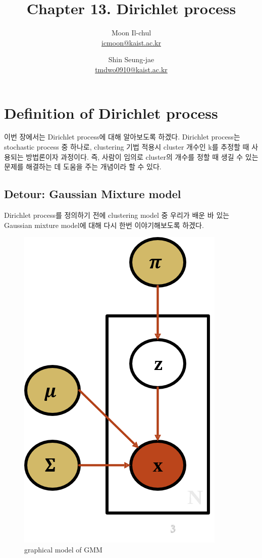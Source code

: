 \documentclass[a4paper]{oblivoir}
\author{Moon Il-chul \\ \href{mailto:icmoon@kaist.ac.kr}{icmoon@kaist.ac.kr} 
   \and Shin Seung-jae \\ \href{mailto:tmdwo0910@kaist.ac.kr}{tmdwo0910@kaist.ac.kr} }
\title{Chapter 13. Dirichlet process}
\begin{document}
\maketitle
\tableofcontents


\section{Definition of Dirichlet process}
이번 장에서는 Dirichlet process에 대해 알아보도록 하겠다. Dirichlet process는 stochastic process 중 하나로, clustering 기법 적용시 cluster 개수인 k를 추정할 때 사용되는 방법론이자 과정이다. 즉, 사람이 임의로 cluster의 개수를 정할 때 생길 수 있는 문제를 해결하는 데 도움을 주는 개념이라 할 수 있다. 

\subsection{Detour: Gaussian Mixture model}
Dirichlet process를 정의하기 전에 clustering model 중 우리가 배운 바 있는 Gaussian mixture model에 대해 다시 한번 이야기해보도록 하겠다. 

\begin{figure}[ht] \centering 
\includegraphics[scale=0.4]{fig13_1.png} 
\caption{graphical model of GMM}
\label{fig:13-1}
\end{figure}
\end{document}
